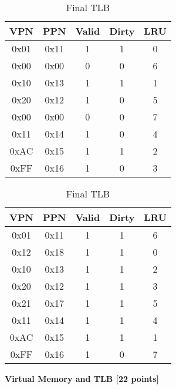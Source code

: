 \documentclass[addpoints, 12pt, answers]{exam}
\begin{document}
\begin{questions}
	\begin{table}[H]
		\begin{minipage}[t]{0.5\linewidth}
			\centering
			\caption{Initial TLB}
			\label{tab:ini-tlb}
			\begin{tabular}{|c|c|c|c|c|}
				\hline
				VPN  & PPN  & Valid & Dirty & LRU \\ \hline
				0x01 & 0x11 & 1     & 1     & 0   \\ \hline
				0x00 & 0x00 & 0     & 0     & 6   \\ \hline
				0x10 & 0x13 & 1     & 1     & 1   \\ \hline
				0x20 & 0x12 & 1     & 0     & 5   \\ \hline
				0x00 & 0x00 & 0     & 0     & 7   \\ \hline
				0x11 & 0x14 & 1     & 0     & 4   \\ \hline
				0xAC & 0x15 & 1     & 1     & 2   \\ \hline
				0xFF & 0x16 & 1     & 0     & 3   \\ \hline
			\end{tabular}
		\end{minipage}
		\begin{minipage}[t]{0.5\linewidth}
			\centering
			\caption{Final TLB}
			\label{tab:fin-tlb}
			\begin{tabular}{|c|c|c|c|c|}
				\hline
				VPN  & PPN  & Valid & Dirty & LRU \\ \hline
				0x01 & 0x11 & 1     & 1     & 6   \\ \hline
				0x12 & 0x18 & 1     & 1     & 0   \\ \hline
				0x10 & 0x13 & 1     & 1     & 2   \\ \hline
				0x20 & 0x12 & 1     & 1     & 3   \\ \hline
				0x21 & 0x17 & 1     & 1     & 5   \\ \hline
				0x11 & 0x14 & 1     & 1     & 4   \\ \hline
				0xAC & 0x15 & 1     & 1     & 1   \\ \hline
				0xFF & 0x16 & 1     & 0     & 7   \\ \hline
			\end{tabular}
		\end{minipage}
	\end{table}




	\pagebreak

	\question[22] \textbf{Virtual Memory and TLB [22 points]}



\end{questions}
\end{document}
